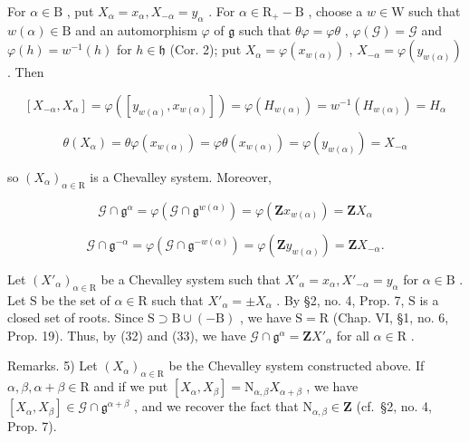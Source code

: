 For \(\alpha \in \mathrm{B}\) , put \(X_{\alpha} = x_{\alpha}, X_{-\alpha} = y_{\alpha}\) . For \(\alpha \in \mathrm{R}_{+} - \mathrm{B}\) , choose a \(w \in \mathrm{W}\) such that \(w(\alpha) \in \mathrm{B}\) and an automorphism \(\varphi\) of \(\mathfrak{g}\) such that \(\theta \varphi = \varphi \theta\) , \(\varphi(\mathcal{G}) = \mathcal{G}\) and \(\varphi(h) = w^{-1}(h)\) for \(h \in \mathfrak{h}\) (Cor. 2); put \(X_{\alpha} = \varphi(x_{w(\alpha)})\) , \(X_{-\alpha} = \varphi(y_{w(\alpha)})\) . Then

\[
[ X _ {- \alpha}, X _ {\alpha} ] = \varphi ([ y _ {w (\alpha)}, x _ {w (\alpha)} ]) = \varphi (H _ {w (\alpha)}) = w ^ {- 1} (H _ {w (\alpha)}) = H _ {\alpha}
\]

\[
\theta (X _ {\alpha}) = \theta \varphi (x _ {w (\alpha)}) = \varphi \theta (x _ {w (\alpha)}) = \varphi (y _ {w (\alpha)}) = X _ {- \alpha}
\]

so \((X_{\alpha})_{\alpha \in \mathrm{R}}\) is a Chevalley system. Moreover,

\[
\mathcal {G} \cap \mathfrak {g} ^ {\alpha} = \varphi (\mathcal {G} \cap \mathfrak {g} ^ {w (\alpha)}) = \varphi (\mathbf {Z} x _ {w (\alpha)}) = \mathbf {Z} X _ {\alpha}\tag{32}
\]

\[
\mathcal {G} \cap \mathfrak {g} ^ {- \alpha} = \varphi (\mathcal {G} \cap \mathfrak {g} ^ {- w (\alpha)}) = \varphi (\mathbf {Z} y _ {w (\alpha)}) = \mathbf {Z} X _ {- \alpha}.\tag{33}
\]

Let \((X'_{\alpha})_{\alpha \in \mathrm{R}}\) be a Chevalley system such that \(X'_{\alpha} = x_{\alpha}, X'_{-\alpha} = y_{\alpha}\) for \(\alpha \in \mathrm{B}\) . Let \(\mathrm{S}\) be the set of \(\alpha \in \mathrm{R}\) such that \(X'_{\alpha} = \pm X_{\alpha}\) . By §2, no. 4, Prop. 7, \(\mathrm{S}\) is a closed set of roots. Since \(\mathrm{S} \supset \mathrm{B} \cup (-\mathrm{B})\) , we have \(\mathrm{S} = \mathrm{R}\) (Chap. VI, §1, no. 6, Prop. 19). Thus, by (32) and (33), we have \(\mathcal{G} \cap \mathfrak{g}^{\alpha} = \mathbf{Z}X'_{\alpha}\) for all \(\alpha \in \mathrm{R}\) .

Remarks. 5) Let \((X_{\alpha})_{\alpha \in \mathrm{R}}\) be the Chevalley system constructed above. If \(\alpha, \beta, \alpha + \beta \in \mathrm{R}\) and if we put \([X_{\alpha}, X_{\beta}] = \mathrm{N}_{\alpha, \beta} X_{\alpha + \beta}\) , we have \([X_{\alpha}, X_{\beta}] \in \mathcal{G} \cap \mathfrak{g}^{\alpha + \beta}\) , and we recover the fact that \(\mathrm{N}_{\alpha, \beta} \in \mathbf{Z}\) (cf.~§2, no. 4, Prop. 7).

